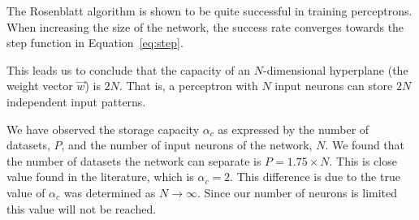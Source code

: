 The Rosenblatt algorithm is shown to be quite successful in training perceptrons.
When increasing the size of the network, the success rate converges towards the step function in Equation~\ref{eq:step}.

This leads us to conclude that the capacity of an \(N\)-dimensional hyperplane (the weight vector \(\vec{w}\)) is \(2N\).
That is, a perceptron with \(N\) input neurons can store \(2N\) independent input patterns.

We have observed the storage capacity $\alpha_c$ as expressed by the number of datasets, $P$, and the number of input neurons of the network, $N$. We found that the number of datasets the network can separate is $P = 1.75 \times N$. This is close value found in the literature, which is $\alpha_c = 2$. This difference is due to the true value of $\alpha_c$ was determined as $N \rightarrow \infty$. Since our number of neurons is limited this value will not be reached.